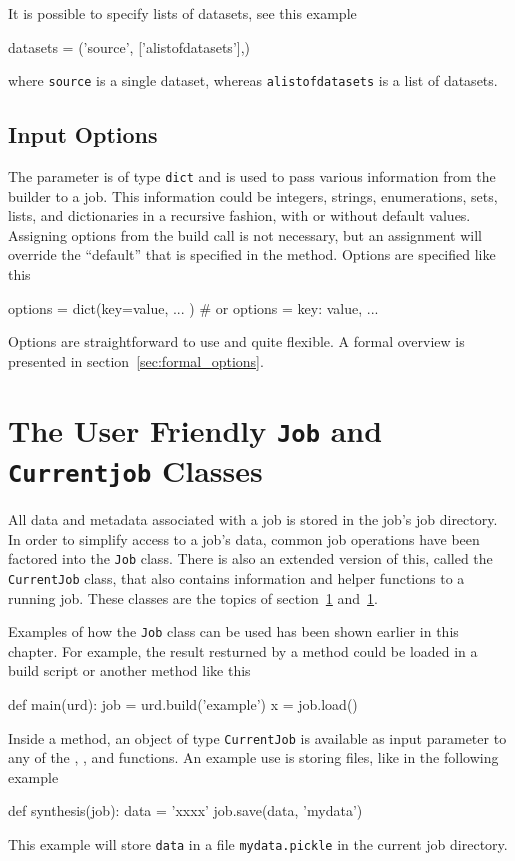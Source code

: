 It is possible to specify lists of datasets, see this example
\begin{python}
datasets = ('source', ['alistofdatasets'],)
\end{python}
where \texttt{source} is a single dataset, whereas
\texttt{alistofdatasets} is a list of datasets.




\subsection*{Input Options}

The \options parameter is of type \texttt{dict} and is used to pass
various information from the builder to a job.  This information could
be integers, strings, enumerations, sets, lists, and dictionaries in a
recursive fashion, with or without default values.  Assigning options
from the build call is not necessary, but an assignment will override
the ``default'' that is specified in the method.  Options are
specified like this
\begin{python}
  options = dict(key=value, ... )  # or
  options = {key: value, ...}
\end{python}

Options are straightforward to use and quite flexible.  A formal
overview is presented in section~\ref{sec:formal_options}.



\section{The User Friendly \texttt{Job} and \texttt{Currentjob} Classes}
All data and metadata associated with a job is stored in the job's job
directory.  In order to simplify access to a job's data, common job
operations have been factored into the \texttt{Job} class.  There is
also an extended version of this, called the \texttt{CurrentJob}
class, that also contains information and helper functions to a
running job.  These classes are the topics of section~\ref{}
and~\ref{}.

Examples of how the \texttt{Job} class can be used has been shown
earlier in this chapter.  For example, the result resturned by a
method could be loaded in a build script or another method like this
\begin{python}
def main(urd):
    job = urd.build('example')
    x = job.load()
\end{python}
Inside a method, an object of type \texttt{CurrentJob} is available as
input parameter to any of the \prepare, \analysis, and \synthesis
functions.  An example use is storing files, like in the following example
\begin{python}
def synthesis(job):
    data = 'xxxx'
    job.save(data, 'mydata')
\end{python}
This example will store \texttt{data} in a file \texttt{mydata.pickle}
in the current job directory.



